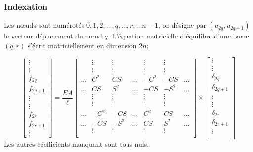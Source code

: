\documentclass{beamer}
\begin{document}
\begin{frame}[fragile]
\frametitle{Indexation}
Les nœuds sont numérotés $0,1,2,\dots ,q,\dots,r,\dots n-1$, on désigne par $(u_{2q},u_{2q+1})$ le vecteur déplacement du nœud $q$. L'équation matricielle d'équilibre d'une barre $(q,r)$ s'écrit matriciellement  en dimension $2n$:

\[
\begin{bmatrix}
  \vdots\\
 \vdots\\
     f_{2q} \\
    f_{2q+1} \\
   \vdots\\
     \vdots\\
     f_{2r} \\
     f_{2r+1} \\
     \vdots
\end{bmatrix}
=\frac{E A}{\ell} 
\begin{bmatrix}
        & \vdots & \vdots & & \vdots& \vdots&  \\
        & \vdots & \vdots & & \vdots& \vdots&  \\
     \dots      & C^2 & CS & \dots & -C^2& -CS& \dots \\
    \dots       & CS & S^2& \dots & -CS& -S^2& \dots\\
        & \vdots & \vdots & & \vdots& \vdots&  \\
        & \vdots & \vdots & & \vdots& \vdots&  \\
     \dots      & -C^2 & -CS & \dots & C^2& CS& \dots\\
      \dots      & -CS & -S^2 & \dots & CS& S^2& \dots\\
        & \vdots & \vdots & & \vdots& \vdots&  \\

\end{bmatrix}
\times
\begin{bmatrix}
  \vdots\\
 \vdots\\
     \delta_{2q} \\
    \delta_{2q+1} \\
   \vdots\\
     \vdots\\
     \delta_{2r} \\
     \delta_{2r+1} \\
     \vdots\\
\end{bmatrix}
\]
Les autres coefficients manquant sont tous nuls. 

\end{frame}
\end{document}
